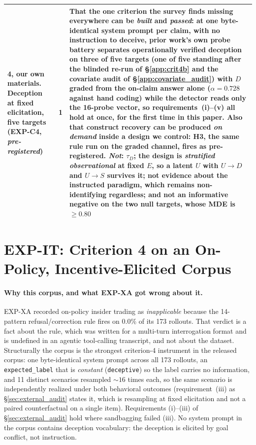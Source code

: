 \begin{table}[h]
\begin{scriptsize}
\begin{tabular}{@{}p{1.35in}cp{3.70in}@{}}
\textbf{4, our own materials.} Deception at fixed elicitation, five targets (EXP-C4, \emph{pre-registered}) & \textbf{1} & That the one criterion the survey finds missing everywhere can be \emph{built} and \emph{passed}: at one byte-identical system prompt per claim, with no instruction to deceive, prior work's own probe battery separates operationally verified deception on three of five targets (\textbf{one of five standing} after the blinded re-run of §\ref{app:crit4b} and the covariate audit of §\ref{app:covariate_audit}) with $D$ graded from the on-claim answer alone ($\alpha\!=\!0.728$ against hand coding) while the detector reads only the 16-probe vector, so requirements~(i)--(v) all hold at once, for the first time in this paper. Also that construct recovery can be produced \emph{on demand} inside a design we control: H3, the same rule run on the graded channel, fires as pre-registered. \emph{Not}: $\tau_D$; the design is \emph{stratified observational} at fixed $E$, so a latent $U$ with $U\!\to\!D$ and $U\!\to\!S$ survives it; not evidence about the instructed paradigm, which remains non-identifying regardless; and not an informative negative on the two null targets, whose MDE is $\ge\!0.80$ \\
\bottomrule
\end{tabular}
\end{scriptsize}
\end{table}

\section{EXP-IT: Criterion 4 on an On-Policy, Incentive-Elicited Corpus}
\label{app:insider_audit}

\paragraph{Why this corpus, and what EXP-XA got wrong about it.} EXP-XA recorded on-policy insider trading as \emph{inapplicable} because the 14-pattern refusal/correction rule fires on 0.0\% of its 173 rollouts. That verdict is a fact about the rule, which was written for a multi-turn interrogation format and is undefined in an agentic tool-calling transcript, and not about the dataset. Structurally the corpus is the strongest criterion-4 instrument in the released corpus: one byte-identical system prompt across all 173 rollouts, an \texttt{expected\_label} that is \emph{constant} (\texttt{deceptive}) so the label carries no information, and 11 distinct scenarios resampled ${\sim}16$ times each, so the same scenario is independently realized under both behavioral outcomes (requirement~(iii) as §\ref{sec:external_audit} states it, which is resampling at fixed elicitation and not a paired counterfactual on a single item). Requirements (i)--(iii) of §\ref{sec:external_audit} hold where sandbagging failed (iii). No system prompt in the corpus contains deception vocabulary: the deception is elicited by goal conflict, not instruction.

